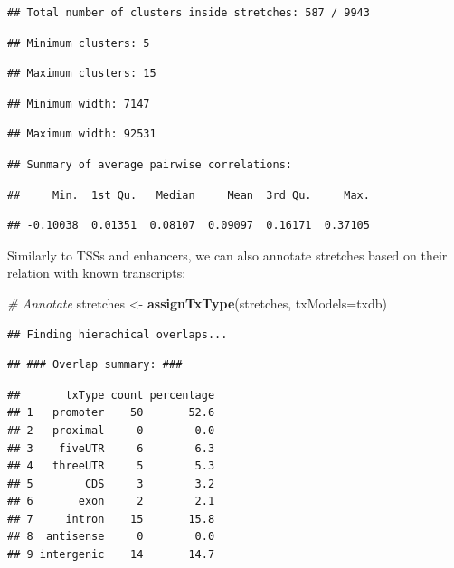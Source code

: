 \documentclass[9pt,a4paper,]{extarticle}
\newenvironment{Shaded}{\begin{snugshade}}{\end{snugshade}}
\newcommand{\KeywordTok}[1]{\textcolor[rgb]{0.13,0.29,0.53}{\textbf{{#1}}}}
\newcommand{\DataTypeTok}[1]{\textcolor[rgb]{0.13,0.29,0.53}{{#1}}}
\newcommand{\StringTok}[1]{\textcolor[rgb]{0.31,0.60,0.02}{{#1}}}
\newcommand{\CommentTok}[1]{\textcolor[rgb]{0.56,0.35,0.01}{\textit{{#1}}}}
\newcommand{\NormalTok}[1]{{#1}}
\begin{document}
\begin{verbatim}
## Total number of clusters inside stretches: 587 / 9943
\end{verbatim}

\begin{verbatim}
## Minimum clusters: 5
\end{verbatim}

\begin{verbatim}
## Maximum clusters: 15
\end{verbatim}

\begin{verbatim}
## Minimum width: 7147
\end{verbatim}

\begin{verbatim}
## Maximum width: 92531
\end{verbatim}

\begin{verbatim}
## Summary of average pairwise correlations:
\end{verbatim}

\begin{verbatim}
##     Min.  1st Qu.   Median     Mean  3rd Qu.     Max.
\end{verbatim}

\begin{verbatim}
## -0.10038  0.01351  0.08107  0.09097  0.16171  0.37105
\end{verbatim}

Similarly to TSSs and enhancers, we can also annotate stretches based on their relation with known transcripts:

\begin{Shaded}
\begin{Highlighting}[]
\CommentTok{# Annotate}
\NormalTok{stretches <-}\StringTok{ }\KeywordTok{assignTxType}\NormalTok{(stretches, }\DataTypeTok{txModels=}\NormalTok{txdb)}
\end{Highlighting}
\end{Shaded}

\begin{verbatim}
## Finding hierachical overlaps...
\end{verbatim}

\begin{verbatim}
## ### Overlap summary: ###
\end{verbatim}

\begin{verbatim}
##       txType count percentage
## 1   promoter    50       52.6
## 2   proximal     0        0.0
## 3    fiveUTR     6        6.3
## 4   threeUTR     5        5.3
## 5        CDS     3        3.2
## 6       exon     2        2.1
## 7     intron    15       15.8
## 8  antisense     0        0.0
## 9 intergenic    14       14.7
\end{verbatim}
\end{document}
